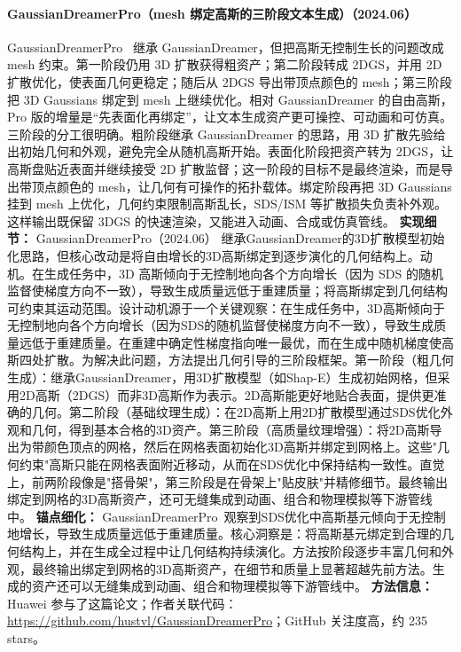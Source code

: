 \paragraph{GaussianDreamerPro（mesh 绑定高斯的三阶段文本生成）（2024.06）}
GaussianDreamerPro~\cite{2406_18462} 继承 GaussianDreamer，但把高斯无控制生长的问题改成 mesh 约束。第一阶段仍用 3D 扩散获得粗资产；第二阶段转成 2DGS，并用 2D 扩散优化，使表面几何更稳定；随后从 2DGS 导出带顶点颜色的 mesh；第三阶段把 3D Gaussians 绑定到 mesh 上继续优化。相对 GaussianDreamer 的自由高斯，Pro 版的增量是“先表面化再绑定”，让文本生成资产更可操控、可动画和可仿真。
三阶段的分工很明确。粗阶段继承 GaussianDreamer 的思路，用 3D 扩散先验给出初始几何和外观，避免完全从随机高斯开始。表面化阶段把资产转为 2DGS，让高斯盘贴近表面并继续接受 2D 扩散监督；这一阶段的目标不是最终渲染，而是导出带顶点颜色的 mesh，让几何有可操作的拓扑载体。绑定阶段再把 3D Gaussians 挂到 mesh 上优化，几何约束限制高斯乱长，SDS/ISM 等扩散损失负责补外观。这样输出既保留 3DGS 的快速渲染，又能进入动画、合成或仿真管线。
\textbf{实现细节：} GaussianDreamerPro（2024.06） 继承GaussianDreamer的3D扩散模型初始化思路，但核心改动是将自由增长的3D高斯绑定到逐步演化的几何结构上。动机。在生成任务中，3D 高斯倾向于无控制地向各个方向增长（因为 SDS 的随机监督使梯度方向不一致），导致生成质量远低于重建质量；将高斯绑定到几何结构可约束其运动范围。设计动机源于一个关键观察：在生成任务中，3D高斯倾向于无控制地向各个方向增长（因为SDS的随机监督使梯度方向不一致），导致生成质量远低于重建质量。在重建中确定性梯度指向唯一最优，而在生成中随机梯度使高斯四处扩散。为解决此问题，方法提出几何引导的三阶段框架。第一阶段（粗几何生成）：继承GaussianDreamer，用3D扩散模型（如Shap-E）生成初始网格，但采用2D高斯（2DGS）而非3D高斯作为表示。2D高斯能更好地贴合表面，提供更准确的几何。第二阶段（基础纹理生成）：在2D高斯上用2D扩散模型通过SDS优化外观和几何，得到基本合格的3D资产。第三阶段（高质量纹理增强）：将2D高斯导出为带颜色顶点的网格，然后在网格表面初始化3D高斯并绑定到网格上。这些"几何约束"高斯只能在网格表面附近移动，从而在SDS优化中保持结构一致性。直觉上，前两阶段像是"搭骨架"，第三阶段是在骨架上"贴皮肤"并精修细节。最终输出绑定到网格的3D高斯资产，还可无缝集成到动画、组合和物理模拟等下游管线中。
\textbf{锚点细化：} GaussianDreamerPro~\cite{2406_18462}观察到SDS优化中高斯基元倾向于无控制地增长，导致生成质量远低于重建质量。核心洞察是：将高斯基元绑定到合理的几何结构上，并在生成全过程中让几何结构持续演化。方法按阶段逐步丰富几何和外观，最终输出绑定到网格的3D高斯资产，在细节和质量上显著超越先前方法。生成的资产还可以无缝集成到动画、组合和物理模拟等下游管线中。
\textbf{方法信息：} Huawei 参与了这篇论文；作者关联代码：\url{https://github.com/hustvl/GaussianDreamerPro}；GitHub 关注度高，约 235 stars。




